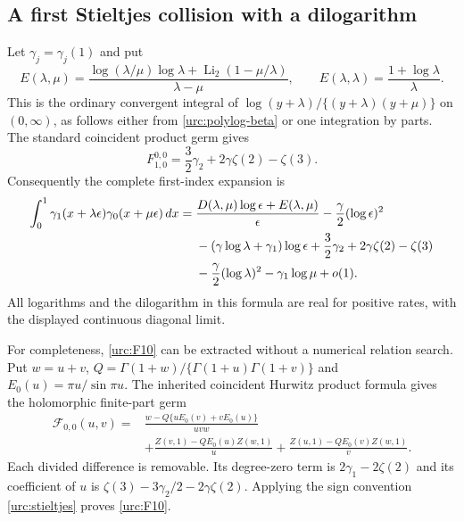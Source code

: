 \documentclass[11pt,a4paper]{article}
\theoremstyle{definition}
\theoremstyle{remark}
\numberwithin{equation}{section}
\begin{document}
\subsection{A first Stieltjes collision with a dilogarithm}

Let $\gamma_j=\gamma_j(1)$ and put
\begin{equation}\label{urc:E}
 E(\lambda,\mu)=
 \frac{\log(\lambda/\mu)\log\lambda+
               \operatorname{Li}_2(1-\mu/\lambda)}{\lambda-\mu},
 \qquad E(\lambda,\lambda)=\frac{1+\log\lambda}{\lambda}.
\end{equation}
This is the ordinary convergent integral of
$\log(y+\lambda)/\{(y+\lambda)(y+\mu)\}$ on $(0,\infty)$,
as follows either from \eqref{urc:polylog-beta} or one integration
by parts. The standard coincident product germ gives
\begin{equation}\label{urc:F10}
 F_{1,0}^{0,0}=\frac32\gamma_2+2\gamma\zeta(2)-\zeta(3).
\end{equation}
Consequently the complete first-index expansion is
\begin{align}
 \int_0^1\gamma_1(x+\lambda\epsilon)
                    \gamma_0(x+\mu\epsilon)\,dx
 ={}&\frac{D(\lambda,\mu)\log\epsilon+E(\lambda,\mu)}\epsilon
       -\frac\gamma2(\log\epsilon)^2\notag\\
 &-(\gamma\log\lambda+\gamma_1)\log\epsilon
       +\frac32\gamma_2+2\gamma\zeta(2)-\zeta(3)\notag\\
 &-\frac\gamma2(\log\lambda)^2-\gamma_1\log\mu+o(1).
 \label{urc:first-Stieltjes-example}
\end{align}
All logarithms and the dilogarithm in this formula are real for
positive rates, with the displayed continuous diagonal limit.

For completeness, \eqref{urc:F10} can be extracted without a
numerical relation search. Put $w=u+v$,
$Q=\Gamma(1+w)/\{\Gamma(1+u)\Gamma(1+v)\}$ and
$E_0(u)=\pi u/\sin\pi u$. The inherited coincident Hurwitz
product formula gives the holomorphic finite-part germ
\begin{align*}
 \mathcal F_{0,0}(u,v)
 ={}&\frac{w-Q\{uE_0(v)+vE_0(u)\}}{uvw}\\
 &+\frac{Z(v,1)-QE_0(u)Z(w,1)}u
  +\frac{Z(u,1)-QE_0(v)Z(w,1)}v.
\end{align*}
Each divided difference is removable. Its degree-zero term is
$2\gamma_1-2\zeta(2)$ and its coefficient of $u$ is
$\zeta(3)-3\gamma_2/2-2\gamma\zeta(2)$. Applying the sign
convention \eqref{urc:stieltjes} proves \eqref{urc:F10}.
\end{document}
